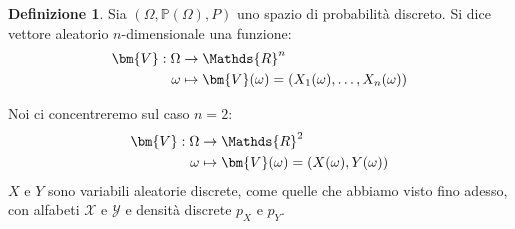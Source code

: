 \documentclass{article}
\theoremstyle{plain}
\theoremstyle{definition}
\newtheorem{definizione}{Definizione}[section]
\theoremstyle{remark}
\begin{document}
\begin{definizione}
	Sia $(\Omega, \mathds{P}(\Omega), P)$ uno spazio di probabilità discreto. Si dice vettore aleatorio $n$-dimensionale una funzione:
	\begin{align*}
		\bm{V}:\Omega&\to\Mathds{R}^n\\
		\omega&\mapsto\bm{V}(\omega)=(X_1 (\omega),\dots,X_n (\omega))
	\end{align*}
\end{definizione}
Noi ci concentreremo sul caso $n=2$:
\begin{align*}
	\bm{V}:\Omega&\to\Mathds{R}^2\\
		\omega&\mapsto\bm{V}(\omega)=(X(\omega),Y(\omega))
\end{align*}
$X$ e $Y$ sono variabili aleatorie discrete, come quelle che abbiamo visto fino adesso, con alfabeti $\mathcal{X}$ e $\mathcal{Y}$ e densità discrete $p_X$ e $p_Y$.
\end{document}
